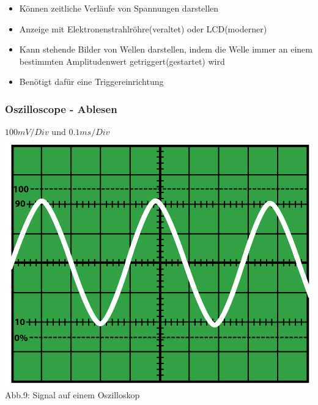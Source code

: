 \begin{frame}
	\begin{itemize}
		\item	Können zeitliche Verläufe von Spannungen darstellen
		\item	Anzeige mit Elektronenstrahlröhre(veraltet) oder LCD(moderner)
		\item	Kann stehende Bilder von Wellen darstellen, indem die Welle immer an einem bestimmten Amplitudenwert getriggert(gestartet) wird
		\item	Benötigt dafür eine Triggereinrichtung
	\end{itemize}
\end{frame}

\begin{frame}
    \frametitle{Oszilloscope - Ablesen}
    \begin{center}
        $100mV / Div$ und $0.1ms / Div$
        \includegraphics[width=.8\textwidth]{a16/OsziTon.png}\\
       	Abb.9: Signal auf einem Oszilloskop \cite{wmde}
	\end{center}
\end{frame}

